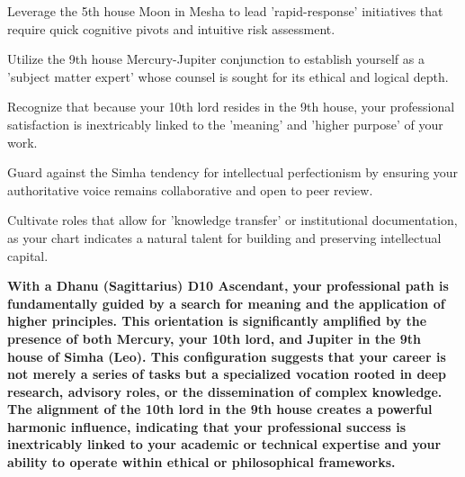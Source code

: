 \begin{diamondlist}
  \item {\fontsize{8.5}{12}\selectfont Leverage the 5th house Moon in Mesha to lead 'rapid-response' initiatives that require quick cognitive pivots and intuitive risk assessment.}
  \item {\fontsize{8.5}{12}\selectfont Utilize the 9th house Mercury-Jupiter conjunction to establish yourself as a 'subject matter expert' whose counsel is sought for its ethical and logical depth.}
  \item {\fontsize{8.5}{12}\selectfont Recognize that because your 10th lord resides in the 9th house, your professional satisfaction is inextricably linked to the 'meaning' and 'higher purpose' of your work.}
  \item {\fontsize{8.5}{12}\selectfont Guard against the Simha tendency for intellectual perfectionism by ensuring your authoritative voice remains collaborative and open to peer review.}
  \item {\fontsize{8.5}{12}\selectfont Cultivate roles that allow for 'knowledge transfer' or institutional documentation, as your chart indicates a natural talent for building and preserving intellectual capital.}
\end{diamondlist}


\label{topic30}

{\fontsize{9.5}{13.8}\selectfont\bfseries\color{DeepSlate} With a Dhanu (Sagittarius) D10 Ascendant, your professional path is fundamentally guided by a search for meaning and the application of higher principles. This orientation is significantly amplified by the presence of both Mercury, your 10th lord, and Jupiter in the 9th house of Simha (Leo). This configuration suggests that your career is not merely a series of tasks but a specialized vocation rooted in deep research, advisory roles, or the dissemination of complex knowledge. The alignment of the 10th lord in the 9th house creates a powerful harmonic influence, indicating that your professional success is inextricably linked to your academic or technical expertise and your ability to operate within ethical or philosophical frameworks.}\par\vspace{2mm}

